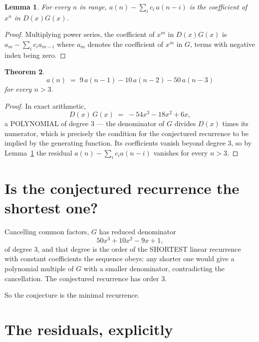 \documentclass[11pt,a4paper]{article}
\theoremstyle{plain}
\newtheorem{theorem}{Theorem}
\newtheorem{lemma}[theorem]{Lemma}
\theoremstyle{definition}
\begin{document}
\begin{lemma}\label{lem:key}
For every $n$ in range, $a(n)-\sum_i c_i\,a(n-i)$ is the coefficient of $x^{n}$ in
$D(x)G(x)$.
\end{lemma}

\begin{proof}
Multiplying power series, the coefficient of $x^{m}$ in $D(x)G(x)$ is
$a_m-\sum_i c_i a_{m-i}$ where $a_m$ denotes the coefficient of $x^{m}$ in $G$, terms with
negative index being zero.
\end{proof}

\begin{theorem}
\[
a(n)\;=\;9\,a(n-1) - 10\,a(n-2) - 50\,a(n-3)
\]
for every $n>3$.
\end{theorem}

\begin{proof}
In exact arithmetic,
\[
D(x)\,G(x)\;=\;- 54 x^{3} - 18 x^{2} + 6 x,
\]
a POLYNOMIAL of degree $3$ --- the denominator of $G$ divides $D(x)$ times its numerator,
which is precisely the condition for the conjectured recurrence to be implied by the
generating function. Its coefficients vanish beyond degree $3$, so by
Lemma~\ref{lem:key} the residual $a(n)-\sum_ic_ia(n-i)$ vanishes for every
$n>3$.
\end{proof}

\section{Is the conjectured recurrence the shortest one?}

Cancelling common factors, $G$ has reduced denominator
\[
50 x^{3} + 10 x^{2} - 9 x + 1,
\]
of degree $3$, and that degree is the order of the SHORTEST linear recurrence with
constant coefficients the sequence obeys: any shorter one would give a polynomial multiple of
$G$ with a smaller denominator, contradicting the cancellation. The conjectured recurrence has
order $3$.

So the conjecture is the minimal recurrence.

\section{The residuals, explicitly}
\end{document}
